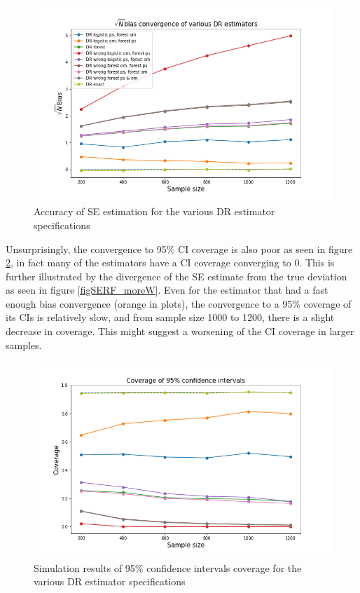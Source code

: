 \documentclass[12pt,twoside]{article}
\begin{document}
\begin{figure}[h!]
    \centering
    \includegraphics[width = 0.9\columnwidth]{figures/sqrtnRF_moreW.png}
    \caption{Accuracy of \citet{lunceford_davidian} SE estimation for the various DR estimator specifications}
    \label{figsqrtnRF_moreW}
\end{figure}

Unsurprisingly, the convergence to 95\% CI coverage is also poor as seen in figure \ref{figCIRF_moreW}, in fact many of the estimators have a CI coverage converging to 0. This is further illustrated by the divergence of the SE estimate from the true deviation as seen in figure \ref{figSERF_moreW}. Even for the estimator that had a fast enough bias convergence (orange in plots), the convergence to a 95\% coverage of its CIs is relatively slow, and from sample size 1000 to 1200, there is a slight decrease in coverage. This might suggest a worsening of the CI coverage in larger samples.

\begin{figure}[h!]
    \centering
    \includegraphics[width = 0.9\columnwidth]{figures/CIRF_moreW.png}
    \caption{Simulation results of 95\% confidence intervals coverage for the various DR estimator specifications}
    \label{figCIRF_moreW}
\end{figure}
\end{document}
